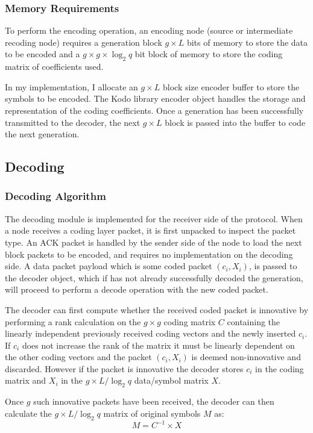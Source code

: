 \documentclass[12pt,a4paper,twoside,openright]{report}
\begin{document}
\subsubsection{Memory Requirements}
To perform the encoding operation, an encoding node (source or intermediate recoding node) requires a generation block $g \times L$ bits of memory to store the data to be encoded and a $g \times g \times \log_2 q$ bit block of memory to store the coding matrix of coefficients used. 

In my implementation, I allocate an $g \times L$ block size encoder buffer to store the symbols to be encoded. The Kodo library encoder object handles the storage and representation of the coding coefficients. Once a generation has been successfully transmitted to the decoder, the next $g \times L$ block is passed into the buffer to code the next generation. 

\subsection{Decoding}

\subsubsection{Decoding Algorithm}

The decoding module is implemented for the receiver side of the protocol. When a node receives a coding layer packet, it is first unpacked to inspect the packet type. An ACK packet is handled by the sender side of the node to load the next block packets to be encoded, and requires no implementation on the decoding side. A data packet payload which is some coded packet $(c_i, X_i)$, is passed to the decoder object, which if has not already successfully decoded the generation, will proceed to perform a decode operation with the new coded packet. 

The decoder can first compute whether the received coded packet is innovative by performing a rank calculation on the $g \times g$ coding matrix $C$ containing the linearly independent previously received coding vectors and the newly inserted $c_i$. If $c_i$ does not increase the rank of the matrix it must be linearly dependent on the other coding vectors and the packet $(c_i, X_i)$ is deemed non-innovative and discarded. However if the packet is innovative the decoder stores $c_i$ in the coding matrix and $X_i$ in the $g \times L / \log_2 q$ data/symbol matrix $X$. 

Once $g$ such innovative packets have been received, the decoder can then calculate the $g \times L / \log_2 q$ matrix of original symbols $M$ as:
\begin{equation}
	M = C^{-1} \times X
\end{equation}
\end{document}
